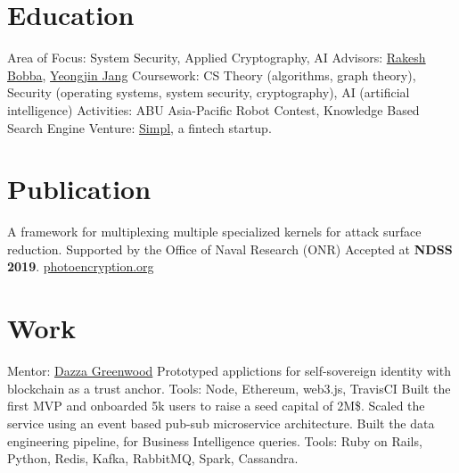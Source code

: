 \documentclass[11pt,a4paper,sans]{moderncv}
\begin{document}
\makecvtitle

\section{Education}
{
    Area of Focus: System Security, Applied Cryptography, AI\newline{}
    Advisors:
    \href{https://eecs.oregonstate.edu/people/bobba-rakesh}{Rakesh Bobba},
    \href{https://www.unexploitable.systems/}{Yeongjin Jang}\newline{}
    Coursework: CS Theory (algorithms, graph theory), Security (operating systems, system security, cryptography), AI (artificial intelligence)\newline{}
}
{
    Activities:
    ABU Asia-Pacific Robot Contest, Knowledge Based Search Engine\newline{}
    Venture: \href{https://www.getsimpl.com}{Simpl}, a fintech startup.
}

\section{Publication}
{
    A framework for multiplexing multiple specialized kernels for attack surface reduction.\newline{}
    Supported by the Office of Naval Research (ONR)\newline{}
}
{
    Accepted at \textbf{NDSS 2019}. \href{https://photoencryption.org}{photoencryption.org}
}

\section{Work}
{
    Mentor: \href{https://web.media.mit.edu/~dang/}{Dazza Greenwood}\newline{}
    Prototyped applictions for self-sovereign identity with blockchain as a trust anchor.\newline{}
    Tools: Node, Ethereum, web3.js, TravisCI
}
{
    Built the first MVP and onboarded 5k users to raise a seed capital of 2M\$.\newline{}
    Scaled the service using an event based pub-sub microservice architecture.\newline{}
    Built the data engineering pipeline, for Business Intelligence queries.\newline{}
    Tools: Ruby on Rails, Python, Redis, Kafka, RabbitMQ, Spark, Cassandra.
}
\end{document}
